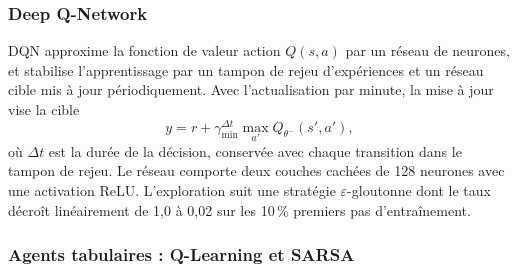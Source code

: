 \documentclass[11pt,a4paper]{article}
\newif\ifrevmarks
\newcommand{\revtag}[1]{\ifrevmarks\textsuperscript{\textcolor{red!70!black}{\scriptsize[#1]}}\fi}
\newcommand{\rev}[2]{\ifrevmarks{\color{revcolor}#2}\revtag{#1}\else#2\fi}
\begin{document}
\subsubsection{Deep Q-Network}

\rev{Bibliographie, M14, v3}{DQN \cite{Mnih2015} approxime la fonction de valeur action $Q(s,a)$ par un réseau de neurones, et stabilise l'apprentissage par un tampon de rejeu d'expériences et un réseau cible mis à jour périodiquement. Avec l'actualisation par minute, la mise à jour vise la cible}
\begin{equation}
y = r + \gamma_{\min}^{\Delta t} \max_{a'} Q_{\theta^-}(s', a') ,
\end{equation}
\rev{v3}{où $\Delta t$ est la durée de la décision, conservée avec chaque transition dans le tampon de rejeu.} Le réseau comporte deux couches cachées de 128 neurones avec une activation ReLU. \rev{v3}{L'exploration suit une stratégie $\varepsilon$-gloutonne dont le taux décroît linéairement de 1,0 à 0,02 sur les 10\,\% premiers pas d'entraînement.}

\subsubsection{Agents tabulaires : Q-Learning et SARSA}
\label{sec:tabular}
\end{document}
